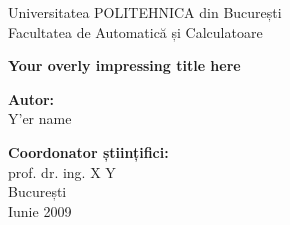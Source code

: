 \thispagestyle{empty}
\begin{center}
\large
Universitatea POLITEHNICA din București \\
Facultatea de Automatică și Calculatoare \\

{\LARGE
	\textbf{Your overly impressing title here}
}

\vspace{3cm}
\textbf{Autor:}\\
Y'er name

\bigskip
\bigskip

\textbf{Coordonator științifici:}\\
prof. dr. ing. X Y\\

București\\
Iunie 2009 \\
\vspace*{1cm}
\end{center}
